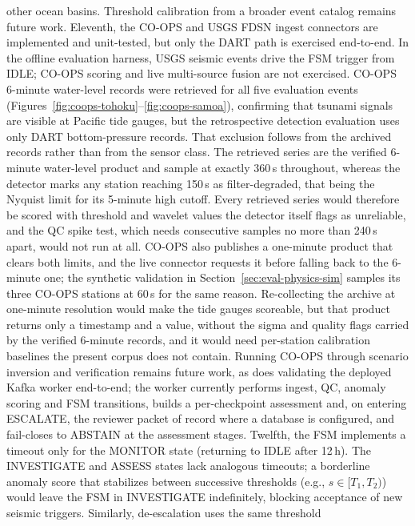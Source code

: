 \documentclass{article}
\begin{document}
other ocean basins.
Threshold calibration from a broader event catalog remains future work.
Eleventh, the CO-OPS and USGS FDSN ingest connectors are implemented and
unit-tested, but only the DART path is exercised end-to-end.  In the
offline evaluation harness, USGS seismic events drive the FSM trigger from
IDLE; CO-OPS scoring and live multi-source fusion are not exercised.
CO-OPS 6-minute water-level records were retrieved for all five evaluation
events (Figures~\ref{fig:coops-tohoku}--\ref{fig:coops-samoa}), confirming
that tsunami signals are visible at Pacific tide gauges, but the
retrospective detection evaluation uses only DART bottom-pressure records.
That exclusion follows from the archived records rather than from the
sensor class.  The retrieved series are the verified 6-minute water-level
product and sample at exactly 360\,s throughout, whereas the detector
marks any station reaching 150\,s as filter-degraded, that being the
Nyquist limit for its 5-minute high cutoff.  Every retrieved series would
therefore be scored with threshold and wavelet values the detector itself
flags as unreliable, and the QC spike test, which needs consecutive
samples no more than 240\,s apart, would not run at all.  CO-OPS also
publishes a one-minute product that clears both limits, and the live
connector requests it before falling back to the 6-minute one; the
synthetic validation in Section~\ref{sec:eval-physics-sim} samples its
three CO-OPS stations at 60\,s for the same reason.  Re-collecting the
archive at one-minute resolution would make the tide gauges scoreable,
but that product returns only a timestamp and a value, without the sigma
and quality flags carried by the verified 6-minute records, and it would
need per-station calibration baselines the present corpus does not
contain.
Running CO-OPS through scenario inversion and verification remains future
work, as does validating the deployed Kafka worker end-to-end; the worker
currently performs ingest, QC, anomaly scoring and FSM transitions,
builds a per-checkpoint assessment and, on entering ESCALATE, the
reviewer packet of record where a database is configured, and
fail-closes to ABSTAIN at the assessment stages.
Twelfth, the FSM implements a timeout only for the MONITOR state
(returning to IDLE after 12\,h).  The INVESTIGATE and ASSESS states
lack analogous timeouts; a borderline anomaly score that stabilizes
between successive thresholds (e.g., $s \in [T_1, T_2)$) would leave
the FSM in INVESTIGATE indefinitely, blocking acceptance of new
seismic triggers.  Similarly, de-escalation uses the same threshold
\end{document}
